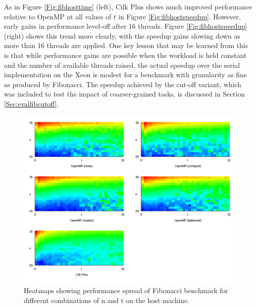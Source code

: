 \documentclass{report}
\begin{document}
As in Figure \ref{Fig:fibhosttime} (left), Cilk Plus shows much improved performance relative to OpenMP at all values of \(t\) in Figure \ref{Fig:fibhostspeedup}. However, early gains in performance level-off after 16 threads. Figure \ref{Fig:fibhostspeedup} (right) shows this trend more clearly, with the speedup gains slowing down as more than 16 threads are applied. One key lesson that may be learned from this is that while performance gains are possible when the workload is held constant and the number of available threads raised, the actual speedup over the serial implementation on the Xeon is modest for a benchmark with granularity as fine as produced by Fibonacci. The speedup achieved by the cut-off variant, which was included to test the impact of coarser-grained tasks, is discussed in Section \ref{Sec:evalfibcutoff}.
\noindent
\begin{figure}[t!]
	\includegraphics[width=\linewidth]{../../heatmaps/intel64/fib}
	\caption{Heatmaps showing performance spread of Fibonacci benchmark for different combinations of n and t on the host machine.}
	\label{Fig:fibhostheatmap}
\end{figure}
\end{document}
